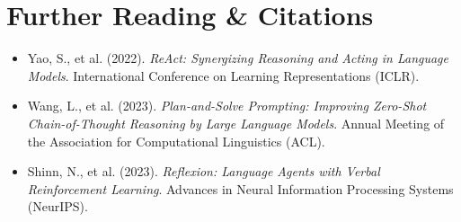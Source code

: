 \section{Further Reading \& Citations}
\begin{itemize}[leftmargin=18pt]
  \item Yao, S., et al. (2022). \emph{ReAct: Synergizing Reasoning and Acting in Language Models}. International Conference on Learning Representations (ICLR).
  \item Wang, L., et al. (2023). \emph{Plan-and-Solve Prompting: Improving Zero-Shot Chain-of-Thought Reasoning by Large Language Models}. Annual Meeting of the Association for Computational Linguistics (ACL).
  \item Shinn, N., et al. (2023). \emph{Reflexion: Language Agents with Verbal Reinforcement Learning}. Advances in Neural Information Processing Systems (NeurIPS).
\end{itemize}
